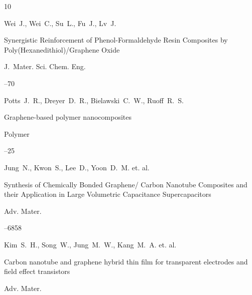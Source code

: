 \begin{thebibliography}{10}






\by Wei~J., Wei~C., Su~L., Fu~J., Lv~J. 


\paper Synergistic Reinforcement of Phenol-Formaldehyde Resin Composites by Poly(Hexanedithiol)/Graphene Oxide

\jour  J.~Mater. Sci. Chem. Eng.



--70





\by Potts~J.~R., Dreyer~D.~R., Bielawski~C.~W., Ruoff~R.~S.

\paper Graphene-based polymer nanocomposites

\jour Polymer




--25







\by Jung~N., Kwon~S., Lee~D., Yoon~D.~M. et. al.

\paper Synthesis of Chemically Bonded Graphene/ Carbon Nanotube Composites and their Application in Large Volumetric Capacitance Supercapacitors

\jour Adv. Mater.




--6858





\by Kim~S.~H., Song~W., Jung~M.~W., Kang~M.~A. et. al.

\paper Carbon nanotube and graphene hybrid thin film for transparent electrodes and field effect transistors

\jour Adv. Mater.


\end{thebibliography}
